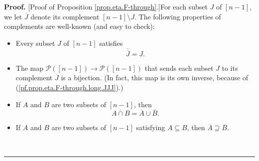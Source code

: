 \documentclass[numbers=enddot,12pt,final,onecolumn,notitlepage]{scrartcl}%
\theoremstyle{definition}
\newenvironment{proof}[1][Proof]{\noindent\textbf{#1.} }{\ \rule{0.5em}{0.5em}}
\newenvironment{verlong}{}{}
\begin{document}
\begin{verlong}


\begin{proof}
[Proof of Proposition \ref{prop.eta.F-through}.]For each subset $J$ of
$\left[  n-1\right]  $, we let $\overline{J}$ denote its complement $\left[
n-1\right]  \setminus J$. The following properties of complements are
well-known (and easy to check):

\begin{itemize}
\item Every subset $J$ of $\left[  n-1\right]  $ satisfies
\begin{equation}
\overline{\overline{J}}=J. \label{pf.prop.eta.F-through.long.JJJ}%
\end{equation}


\item The map $\mathcal{P}\left(  \left[  n-1\right]  \right)  \rightarrow
\mathcal{P}\left(  \left[  n-1\right]  \right)  $ that sends each subset $J$
to its complement $\overline{J}$ is a bijection. (In fact, this map is its own
inverse, because of (\ref{pf.prop.eta.F-through.long.JJJ}).)

\item If $A$ and $B$ are two subsets of $\left[  n-1\right]  $, then%
\begin{equation}
\overline{A\cap B}=\overline{A}\cup\overline{B}.
\label{pf.prop.eta.F-through.long.deMor}%
\end{equation}


\item If $A$ and $B$ are two subsets of $\left[  n-1\right]  $ satisfying
$A\subseteq B$, then $\overline{A}\supseteq\overline{B}$.


\end{itemize}
\end{proof}
\end{verlong}
\end{document}
